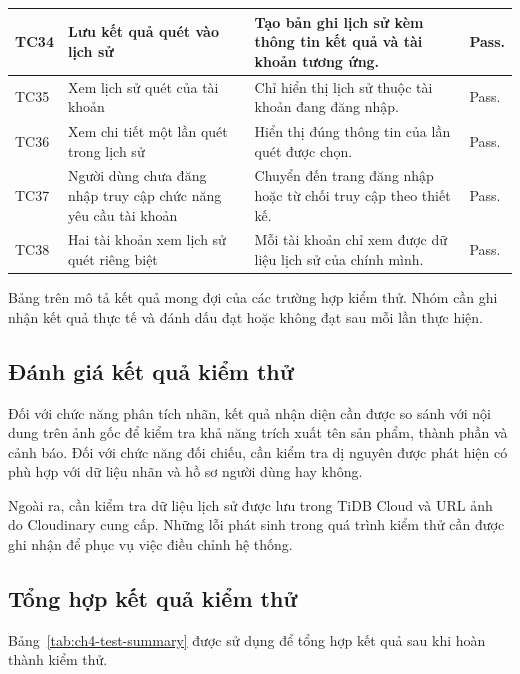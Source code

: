 \begin{longtable}{|>{\centering\arraybackslash}p{0.8cm}|>{\raggedright\arraybackslash}p{3.1cm}|>{\raggedright\arraybackslash}p{8.2cm}|>{\raggedright\arraybackslash}p{2.2cm}|}
	TC34 & Lưu kết quả quét vào lịch sử & Tạo bản ghi lịch sử kèm thông tin kết quả và tài khoản tương ứng. & Pass. \\ \hline
	TC35 & Xem lịch sử quét của tài khoản & Chỉ hiển thị lịch sử thuộc tài khoản đang đăng nhập. & Pass. \\ \hline
	TC36 & Xem chi tiết một lần quét trong lịch sử & Hiển thị đúng thông tin của lần quét được chọn. & Pass. \\ \hline
	TC37 & Người dùng chưa đăng nhập truy cập chức năng yêu cầu tài khoản & Chuyển đến trang đăng nhập hoặc từ chối truy cập theo thiết kế. &Pass. \\ \hline
	TC38 & Hai tài khoản xem lịch sử quét riêng biệt & Mỗi tài khoản chỉ xem được dữ liệu lịch sử của chính mình. & Pass. \\ \hline
\end{longtable}

Bảng trên mô tả kết quả mong đợi của các trường hợp kiểm thử. Nhóm cần ghi nhận kết quả thực tế và đánh dấu đạt hoặc không đạt sau mỗi lần thực hiện.

\subsection{Đánh giá kết quả kiểm thử}

Đối với chức năng phân tích nhãn, kết quả nhận diện cần được so sánh với nội dung trên ảnh gốc để kiểm tra khả năng trích xuất tên sản phẩm, thành phần và cảnh báo. Đối với chức năng đối chiếu, cần kiểm tra dị nguyên được phát hiện có phù hợp với dữ liệu nhãn và hồ sơ người dùng hay không.

Ngoài ra, cần kiểm tra dữ liệu lịch sử được lưu trong TiDB Cloud và URL ảnh do Cloudinary cung cấp. Những lỗi phát sinh trong quá trình kiểm thử cần được ghi nhận để phục vụ việc điều chỉnh hệ thống.

\subsection{Tổng hợp kết quả kiểm thử}

Bảng~\ref{tab:ch4-test-summary} được sử dụng để tổng hợp kết quả sau khi hoàn thành kiểm thử.

